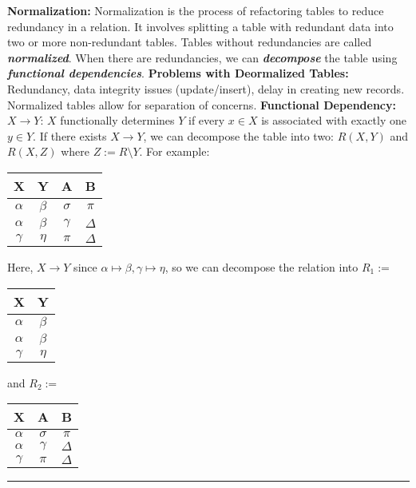 \documentclass{report}
\renewcommand{\bf}[1]{\textbf{{#1}}}
\newcommand{\ib}[1]{\textit{\textbf{{#1}}}}
\begin{document}
\bf{Normalization:} Normalization is the process of refactoring tables to reduce redundancy in a
relation. It involves splitting a table with redundant data into two or more non-redundant tables.
Tables without redundancies are called \ib{normalized}. When there are redundancies, we can
\ib{decompose} the table using \ib{functional dependencies}.
\hfil \newline
\bf{Problems with Deormalized Tables:} Redundancy, data integrity issues (update/insert), delay in
creating new records. Normalized tables allow for separation of concerns.
\hfil \newline
\bf{Functional Dependency:} $X \to Y$: $X$ functionally determines $Y$ if every $x \in X$ is
associated with exactly one $y \in Y$. If there exists $X \to Y$, we can decompose the table into
two: $R(X, Y)$ and $R(X, Z)$ where $Z := R \setminus Y$. For example:
\hfil \newline
\begin{tabular}{c|c|c|c}
    X & Y & A & B \\
    \hline
    $\alpha$ & $\beta$ & $\sigma$ & $\pi$ \\
    $\alpha$ & $\beta$ & $\gamma$ & $\Delta$ \\
    $\gamma$ & $\eta$ & $\pi$ & $\Delta$ \\
\end{tabular}
Here, $X \to Y$ since $\alpha \mapsto \beta, \gamma \mapsto \eta$, so we can decompose the
relation into $R_1 :=$
\begin{tabular}{c|c}
    X & Y \\
    \hline
    $\alpha$ & $\beta$ \\ 
    $\alpha$ & $\beta$ \\
    $\gamma$ & $\eta$  \\
\end{tabular}
and $R_2 :=$
\begin{tabular}{c|c|c}
    X & A & B \\
    \hline
    $\alpha$ & $\sigma$ & $\pi$ \\
    $\alpha$ & $\gamma$ & $\Delta$ \\
    $\gamma$ & $\pi$ & $\Delta$ \\
\end{tabular}
\hfil \newline
\hrule
\vspace{0.2em}
\end{document}
